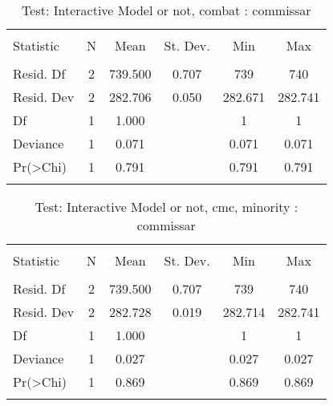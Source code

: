 \documentclass[12pt,letterpaper]{article}
\begin{document}
\begin{table}[!htbp] \centering 
	\caption{Test: Interactive Model or not, combat : commissar} 
	\label{} 
	\begin{tabular}{@{\extracolsep{5pt}}lccccc} 
		\\[-1.8ex]\hline 
		\hline \\[-1.8ex] 
		Statistic & \multicolumn{1}{c}{N} & \multicolumn{1}{c}{Mean} & \multicolumn{1}{c}{St. Dev.} & \multicolumn{1}{c}{Min} & \multicolumn{1}{c}{Max} \\ 
		\hline \\[-1.8ex] 
		Resid. Df & 2 & 739.500 & 0.707 & 739 & 740 \\ 
		Resid. Dev & 2 & 282.706 & 0.050 & 282.671 & 282.741 \\ 
		Df & 1 & 1.000 &  & 1 & 1 \\ 
		Deviance & 1 & 0.071 &  & 0.071 & 0.071 \\ 
		Pr(\textgreater Chi) & 1 & 0.791 &  & 0.791 & 0.791 \\ 
		\hline \\[-1.8ex] 
	\end{tabular} 
\end{table} 


\begin{table}[!htbp] \centering 
	\caption{Test: Interactive Model or not, cmc, minority : commissar} 
	\label{} 
	\begin{tabular}{@{\extracolsep{5pt}}lccccc} 
		\\[-1.8ex]\hline 
		\hline \\[-1.8ex] 
		Statistic & \multicolumn{1}{c}{N} & \multicolumn{1}{c}{Mean} & \multicolumn{1}{c}{St. Dev.} & \multicolumn{1}{c}{Min} & \multicolumn{1}{c}{Max} \\ 
		\hline \\[-1.8ex] 
		Resid. Df & 2 & 739.500 & 0.707 & 739 & 740 \\ 
		Resid. Dev & 2 & 282.728 & 0.019 & 282.714 & 282.741 \\ 
		Df & 1 & 1.000 &  & 1 & 1 \\ 
		Deviance & 1 & 0.027 &  & 0.027 & 0.027 \\ 
		Pr(\textgreater Chi) & 1 & 0.869 &  & 0.869 & 0.869 \\ 
		\hline \\[-1.8ex] 
	\end{tabular} 
\end{table} 
\end{document}
